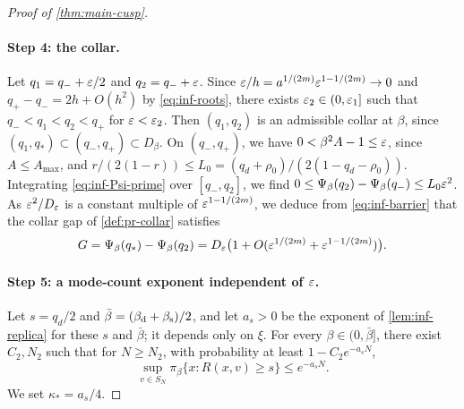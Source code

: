 \begin{proof}[Proof of \cref{thm:main-cusp}]
\paragraph{Step 4: the collar.} Let $q_1=q_-+\varepsilon/2$ and $q_2=q_-+\varepsilon$. Since $\varepsilon/h=a^{1/(2m)}\varepsilon^{1-1/(2m)}\to0$ and $q_+-q_-=2h+O(h^2)$ by \eqref{eq:inf-roots}, there exists $\varepsilon_2\in(0,\varepsilon_1]$ such that $q_-<q_1<q_2<q_+$ for $\varepsilon<\varepsilon_2$. Then $(q_1,q_2)$ is an admissible collar at $\beta$, since $(q_1,q_*)\subset(q_-,q_+)\subset D_\beta$. On $(q_-,q_+)$, we have $0<\beta^2A-1\le\varepsilon$, since $A\le A_{\max}$, and $r/(2(1-r))\le L_0=(q_d+\rho_0)/(2(1-q_d-\rho_0))$. Integrating \eqref{eq:inf-Psi-prime} over $[q_-,q_2]$, we find $0\le\Psi_\beta(q_2)-\Psi_\beta(q_-)\le L_0\varepsilon^2$. As $\varepsilon^2/D_\varepsilon$ is a constant multiple of $\varepsilon^{1-1/(2m)}$, we deduce from \eqref{eq:inf-barrier} that the collar gap of \cref{def:pr-collar} satisfies
\begin{equation}\label{eq:inf-collar-gap}
G=\Psi_\beta(q_*)-\Psi_\beta(q_2)=D_\varepsilon\bigl(1+O(\varepsilon^{1/(2m)}+\varepsilon^{1-1/(2m)})\bigr).
\end{equation}

\paragraph{Step 5: a mode-count exponent independent of $\varepsilon$.} Let $s=q_d/2$ and $\bar\beta=(\beta_{\mathrm d}+\beta_{\mathrm s})/2$, and let $a_s>0$ be the exponent of \cref{lem:inf-replica} for these $s$ and $\bar\beta$; it depends only on $\xi$. For every $\beta\in(0,\bar\beta]$, there exist $C_2,N_2$ such that for $N\ge N_2$, with probability at least $1-C_2e^{-a_sN}$,
\begin{equation}\label{eq:inf-cusp-column}
\sup_{v\in S_N}\pi_\beta\{x:R(x,v)\ge s\}\le e^{-a_sN}.
\end{equation}
We set $\kappa_*=a_s/4$.


\end{proof}
